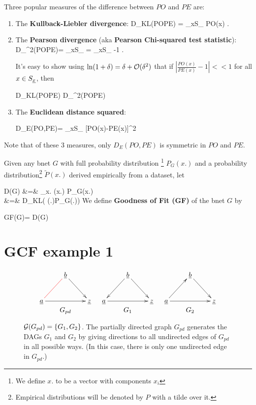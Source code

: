 \documentclass[12pt]{article}
\begin{document}
Three popular
measures of
the difference between $PO$ and $PE$
are:
\begin{enumerate}
\item
The
{\bf Kullback-Liebler divergence}:
\beq
D_{KL}(PO\parallel PE) =
\sum_{x\in S_\rvx}
PO(x)\ln {}
\;.
\eeq
\item
The
{\bf Pearson divergence}
(aka {\bf Pearson Chi-squared test statistic}):
\beq
D_{\chi^2}(PO\parallel PE)=
\sum_{x\in S_\rvx}
=
\sum_{x\in S_\rvx}
-1
\;.
\eeq

It's easy to show 
using $\ln(1+\delta)=\delta +{\cal O}(\delta^2)$
that
if $\left|\frac{PO(x)}{PE(x)}-1\right|<<1$
for all $x\in S_{\underline{x}}$, then

\beq
D_{KL}(PO\parallel PE)\approx 
D_{\chi^2}(PO\parallel PE)
\eeq

\item
The {\bf Euclidean distance squared}:

\beq
D_E(PO,PE)=
\sum_{x\in S_\rvx}
[PO(x)-PE(x)]^2
\eeq
\end{enumerate}
Note that of these 3 measures,
only $D_E(PO, PE)$ is symmetric 
in $PO$ and $PE$.


Given any bnet $G$
with full probability
distribution
\footnote{We define
$x.$
to be a vector
with components $x_i$}
  $P_G(x.)$
and a
probability distribution\footnote{
Empirical distributions will 
be denoted by $P$ with a tilde over it.}
$\tilde{P}(x.)$
derived empirically from a dataset,
let

\beqa
D(G)
&=&
\sum_{x.}
(x.)\ln 
{}
{P_{G}(x.)}
\\
&=&
D_{KL}(
(\rvx.)\parallel P_{G}(\rvx.))
\eeqa
We define {\bf Goodness of Fit (GF)}
of the bnet $G$ by

\beq
GF(G)=\ln {}
{D(G)}
\eeq

\section{GCF example 1}

\begin{figure}[h!]
$$
\begin{array}{ccc}
\xymatrix{
&\rvb\ar@[red]@{-}[ld]\ar[dr]
\\
\rva\ar[rr]&&\rvz
}
&
\xymatrix{
&\rvb\ar[dl]\ar[dr]
\\
\rva\ar[rr]&&\rvz
}
&
\xymatrix{
&\rvb\ar[dr]
\\
\rva\ar[ur]\ar[rr]&&\rvz
}
\\
G_{pd}&G_1&G_2
\end{array}
$$
\caption{${\cal G}(G_{pd})=\{G_1, G_2\}$.
The partially directed graph $G_{pd}$
generates the DAGs $G_1$ and $G_2$
by giving directions to
all undirected edges of $G_{pd}$
in
all possible ways.
(In this case, there is only one
undirected edge in $G_{pd}$.) }
\label{fig-ob-eq-1}
\end{figure}
\end{document}
